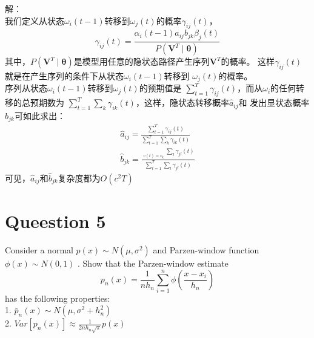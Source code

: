 \documentclass[a4paper,11pt,onecolumn,oneside,UTF8]{article}
\begin{document}
解：\\
我们定义从状态$\omega_i\left(t-1\right)$转移到$\omega_j\left(t\right)$的概率$\gamma_{ij}\left(t\right)$，\\
$$
    \gamma_{ij}\left(t\right) = \frac{\alpha_i\left(t-1\right)a_{ij}b_{jk}\beta_j\left(t\right)}{P
    \left(\bm V^T\mid\bm\theta\right)}
$$
其中，$P\left(\bm V^T\mid\bm\theta\right)$是模型用任意的隐状态路径产生序列$\bm V^T$的概率。
这样$\gamma_{ij}\left(t\right)$就是在产生序列的条件下从状态$\omega_i\left(t-1\right)$转移到
$\omega_j\left(t\right)$的概率。\\
序列从状态$\omega_i\left(t-1\right)$转移到$\omega_j\left(t\right)$的预期值是
$\sum_{t=1}^T\gamma_{ij}\left(t\right)$，而从$\omega_i$的任何转移的总预期数为
$\sum_{t=1}^T\sum_k\gamma_{ik}\left(t\right)$，这样，隐状态转移概率$\hat a_{ij}$和
发出显状态概率$\hat b_{jk}$可如此求出：\\
$$
    \begin{aligned}
        \hat a_{ij} = \frac{\sum_{t=1}^T\gamma_{ij}\left(t\right)}
        {\sum_{t=1}^T\sum_k\gamma_{ik}\left(t\right)} \\
        \hat b_{jk} = \frac{\mathop{\sum_{t=1}^T}\limits_{v\left(t\right)=v_k}\sum_l\gamma_{jl}\left(t\right)}
        {\sum_{t=1}^T\sum_l\gamma_{jl}\left(t\right)}
    \end{aligned}
$$
可见，$\hat{a}_{ij}$和$\hat{b}_{jk}$复杂度都为$O\left(c^2T\right)$


\section*{Queestion 5}
Consider a normal $p\left(x\right)\sim N\left(\mu,\sigma^2\right)$ and Parzen-window function
$\phi\left(x\right)\sim N\left(0, 1\right)$ . Show that the Parzen-window estimate
$$
    p_n\left(x\right) = \frac{1}{nh_n}\sum\limits_{i=1}^n\phi\left(\frac{x-x_i}{h_n}\right)
$$
has the following properties: \\
1. $\bar p_n\left(x\right)\sim N\left(\mu,\sigma^2+h_n^2\right)$\\
2. $Var\left[p_n\left(x\right)\right] \approx \frac{1}{2nh_n\sqrt\pi}p\left(x\right)$
\end{document}
